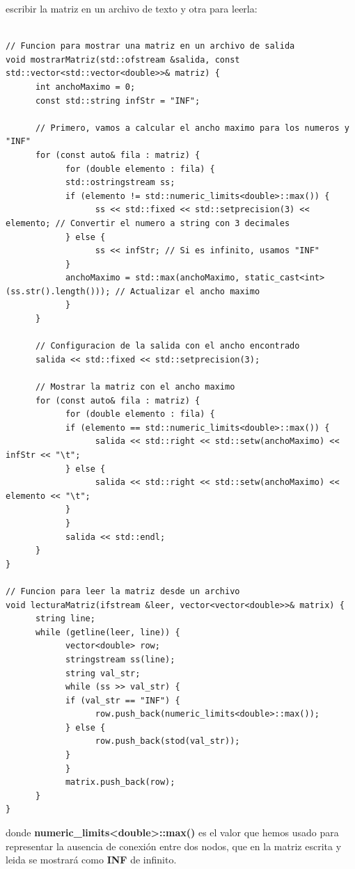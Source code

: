 \documentclass[11pt,openany]{book}
\begin{document}
escribir la matriz en un archivo de texto y otra para leerla:
\begin{lstlisting}

// Funcion para mostrar una matriz en un archivo de salida
void mostrarMatriz(std::ofstream &salida, const std::vector<std::vector<double>>& matriz) {
      int anchoMaximo = 0;
      const std::string infStr = "INF";

      // Primero, vamos a calcular el ancho maximo para los numeros y "INF"
      for (const auto& fila : matriz) {
            for (double elemento : fila) {
            std::ostringstream ss;
            if (elemento != std::numeric_limits<double>::max()) {
                  ss << std::fixed << std::setprecision(3) << elemento; // Convertir el numero a string con 3 decimales
            } else {
                  ss << infStr; // Si es infinito, usamos "INF"
            }
            anchoMaximo = std::max(anchoMaximo, static_cast<int>(ss.str().length())); // Actualizar el ancho maximo
            }
      }

      // Configuracion de la salida con el ancho encontrado
      salida << std::fixed << std::setprecision(3);

      // Mostrar la matriz con el ancho maximo
      for (const auto& fila : matriz) {
            for (double elemento : fila) {
            if (elemento == std::numeric_limits<double>::max()) {
                  salida << std::right << std::setw(anchoMaximo) << infStr << "\t";
            } else {
                  salida << std::right << std::setw(anchoMaximo) << elemento << "\t";
            }
            }
            salida << std::endl;
      }
}
      
// Funcion para leer la matriz desde un archivo
void lecturaMatriz(ifstream &leer, vector<vector<double>>& matrix) {
      string line;
      while (getline(leer, line)) {
            vector<double> row;
            stringstream ss(line);
            string val_str;
            while (ss >> val_str) {
            if (val_str == "INF") {
                  row.push_back(numeric_limits<double>::max());
            } else {
                  row.push_back(stod(val_str));
            }
            }
            matrix.push_back(row);
      }
}
\end{lstlisting}
donde \textbf{numeric\_limits<double>::max()} es el valor que hemos usado para representar la ausencia de conexión entre dos nodos, que
en la matriz escrita y leida se mostrará como \textbf{INF} de infinito.\\ \\
\end{document}
